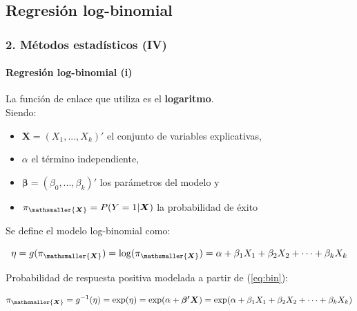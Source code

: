 \documentclass{beamer}
\begin{document}
\subsection{Regresión log-binomial}
\begin{frame}
\frametitle{2. Métodos estadísticos (IV)}
\framesubtitle{Regresión log-binomial (i)}
La función de enlace que utiliza es el {\color{green!55!blue} \textbf{logaritmo}}.\\
\vspace{0.2cm}
Siendo:
   	\begin{itemize}
		\item $\boldsymbol{X}= (X_1,...,X_k)'$ el conjunto de variables explicativas,
		\item $\alpha$ el término independiente,
		\item $\boldsymbol{\beta}=(\beta_0,...,\beta_k)'$ los parámetros del modelo y
		\item $\pi_{\mathsmaller{\boldsymbol{X}}}=P(Y=1|\boldsymbol{X})$ la probabilidad de éxito
	\end{itemize}
\vspace{0.2cm}
Se define el modelo log-binomial como:

	\begin{block}{ }
	\small
	\vspace{-0.15cm}
	\begin{equation}
	\label{eq:bin}
	\eta=g(\pi_{\mathsmaller{\boldsymbol{X}}})=\log(\pi_{\mathsmaller{\boldsymbol{X}}})=\alpha + \beta_1X_1 + \beta_2X_2 + \cdots + \beta_kX_k
	\end{equation}
	\normalsize
	\end{block}
\vspace{0.2cm}
Probabilidad de respuesta positiva modelada a partir de (\ref{eq:bin}):
	\begin{block}{ }
	\small
	\vspace{-0.4cm}
	$$\pi_{\mathsmaller{\boldsymbol{X}}}=g^{-1}(\eta)=\exp(\eta)=\exp(\alpha +\boldsymbol{\beta'X})=\exp(\alpha + \beta_1X_1 + \beta_2X_2 + \cdots + \beta_kX_k)$$
	\normalsize
	\end{block}
\end{frame}
\end{document}
